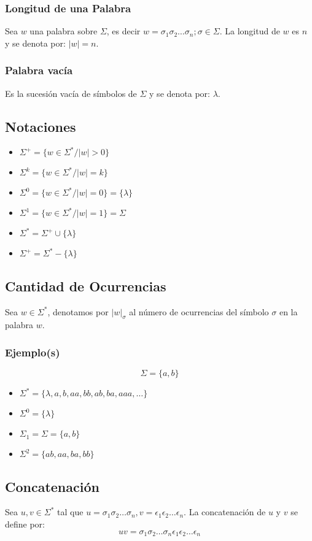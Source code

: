 \subsubsection{Longitud de una Palabra}
Sea $w$ una palabra sobre $\Sigma$, es decir $w=\sigma_1\sigma_2\ldots\sigma_n ; \sigma\in\Sigma$. La longitud de $w$ es $n$ y se denota por: $|w|=n$.
\subsubsection{Palabra vacía}
Es la sucesión vacía de símbolos de $\Sigma$ y se denota por: $\lambda$.
\subsection{Notaciones}
\begin{itemize}
\item $\Sigma^+ = \{ w\in\Sigma^* / |w|>0\}$
\item $\Sigma^k = \{ w\in\Sigma^* / |w|=k\}$
\item $\Sigma^0 = \{ w\in\Sigma^* / |w|=0\}=\{\lambda\}$
\item $\Sigma^1 = \{ w\in\Sigma^* / |w|=1\}=\Sigma$
\item $\Sigma^* = \Sigma^+ \cup \{\lambda\}$
\item $\Sigma^+ = \Sigma^* - \{\lambda\}$
\end{itemize}
\subsection{Cantidad de Ocurrencias}
Sea $w\in\Sigma^*$, denotamos por $|w|_\sigma$ al número de ocurrencias del símbolo $\sigma$ en la palabra $w$.
\subsubsection{Ejemplo(s)}
$$\Sigma = \{ a,b \} $$

\begin{itemize}
\item $\Sigma^{*}= \{\lambda, a,b,aa,bb,ab,ba,aaa,\ldots\}$
\item $\Sigma^0=\{\lambda\}$
\item $\Sigma_1 =\Sigma = \{a,b\}$
\item $\Sigma^2 = \{ ab,aa,ba,bb \}$
\end{itemize}
\subsection{Concatenación}
Sea $u,v\in\Sigma^*$ tal que $u=\sigma_1\sigma_2\ldots\sigma_n, v=\epsilon_1\epsilon_2\ldots\epsilon_n$. La concatenación de $u$ y $v$ se define por:
$$uv=\sigma_1\sigma_2\ldots\sigma_n \epsilon_1\epsilon_2\ldots\epsilon_n$$
